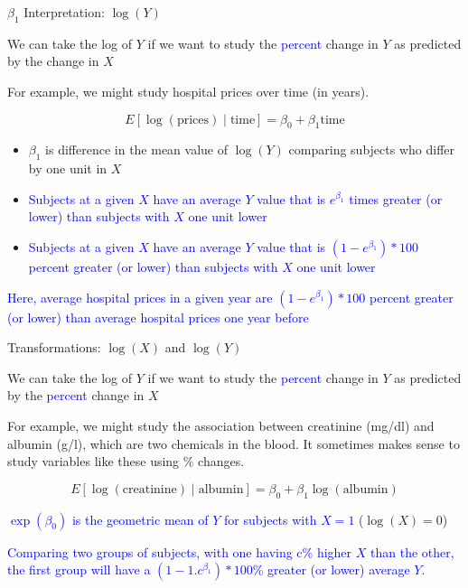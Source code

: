 \documentclass[10pt,t]{beamer}
\begin{document}
\begin{frame}{$\beta_1$ Interpretation: $\log(Y)$}
	
	\vspace{-5 mm}
	
	We can take the log of $Y$ if we want to study the \textcolor{blue}{percent} change in $Y$ as predicted by the change in $X$
	\medskip
	
	For example, we might study hospital prices over time (in years). 


	$$
	E[\log(\text{prices}) \mid \text{time}] = \beta_0 + \beta_1 \text{time}
	$$
	\medskip
	
	\begin{itemize}
		\item $\beta_1$ is difference in the mean value of $\log(Y)$ comparing subjects who differ by one unit in $X$
		\medskip
		
		\item \textcolor{blue}{Subjects at a given $X$ have an average $Y$ value that is $e^{\beta_1}$ times greater (or lower) than subjects with $X$ one unit lower}
		\medskip
		
		\item \textcolor{blue}{Subjects at a given $X$ have an average $Y$ value that is $(1-e^{\beta_1})*100$ percent greater (or lower) than subjects with $X$ one unit lower}
		\bigskip
	\end{itemize}
	
	\textcolor{blue}{Here, average hospital prices in a given year are $(1-e^{\beta_1})*100$ percent greater (or lower) than average hospital prices one year before}
	
	
	
\end{frame}



\begin{frame}{Transformations: $\log(X)$ and $\log(Y)$}
	
	\vspace{-5 mm}
	
	We can take the log of $Y$ if we want to study the \textcolor{blue}{percent} change in $Y$ as predicted by the \textcolor{blue}{percent} change in $X$
	\medskip
	
	For example, we might study the association between creatinine (mg/dl) and  albumin (g/l), which are two chemicals in the blood. It sometimes makes sense to study variables like these using \% changes. 
	
	
	$$
	E[\log(\text{creatinine}) \mid \text{albumin}] = \beta_0 + \beta_1 \log(\text{albumin})
	$$
	\smallskip
	
\textcolor{blue}{$\exp(\beta_0)$ is the geometric mean of $Y$ for subjects with $X=1$} ($\log(X)=0$)
	\bigskip
	
	\textcolor{blue}{Comparing two groups of subjects, with one having c\% higher $X$ than the other, the first group will have a $(1-1.c^{\beta_1})*100$\% greater (or lower) average $Y$.}
	
	
\end{frame}
\end{document}
